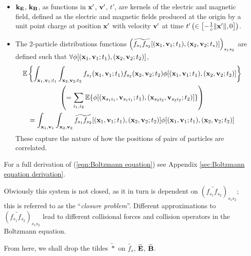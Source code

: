     \begin{itemize}
        \item  $\mathbf{k}_{\mathbf{E}}$, $\mathbf{k}_{\mathbf{B}}$, as functions in $\mathbf{x}'$, $\mathbf{v}'$, $t'$, are kernels of the electric and magnetic field, defined as the electric and magnetic fields produced at the origin by a unit point charge at position $\mathbf{x}'$ with velocity $\mathbf{v}'$ at time $t' \left(\in \left[-\frac{1}{c}\|\mathbf{x}'\|, 0\right]\right)$. 
        
        \item  The 2-particle distributions functions $\left(\widetilde{f_{s_{1}}f_{s_{2}}}[(\mathbf{x}_{1}, \mathbf{v}_{1}; t_{1}), (\mathbf{x}_{2}, \mathbf{v}_{2}; t_{s})]\right)_{s_{1}s_{2}}$ are defined such that $\forall \phi[(\mathbf{x}_{1}, \mathbf{v}_{1}; t_{1}), (\mathbf{x}_{2}, \mathbf{v}_{2}; t_{2})]$,
        \begin{multline}
            \mathbb{E}\left\{\int_{\mathbf{x}_{1}, \mathbf{v}_{1}; t_{1}}\int_{\mathbf{x}_{2}, \mathbf{v}_{2}; t_{2}}f_{s_{1}}(\mathbf{x}_{1}, \mathbf{v}_{1}; t_{1})f_{s_{2}}(\mathbf{x}_{2}, \mathbf{v}_{2}; t_{2})\phi[(\mathbf{x}_{1}, \mathbf{v}_{1}; t_{1}), (\mathbf{x}_{2}, \mathbf{v}_{2}; t_{2})]\right\}  \\
            \left(=  \sum_{i_{1}, i_{2}}\mathbb{E}\{\phi[(\mathbf{x}_{s_{1}i_{1}}, \mathbf{v}_{s_{1}i_{1}}; t_{1}), (\mathbf{x}_{s_{2}i_{2}}, \mathbf{v}_{s_{2}i_{2}}; t_{2})]\}\right)  \\
            =  \int_{\mathbf{x}_{1}, \mathbf{v}_{1}}\int_{\mathbf{x}_{2}, \mathbf{v}_{2}}\widetilde{f_{s_{1}}f_{s_{2}}}[(\mathbf{x}_{1}, \mathbf{v}_{1}; t_{1}), (\mathbf{x}_{2}, \mathbf{v}_{2}; t_{2})]\phi[(\mathbf{x}_{1}, \mathbf{v}_{1}; t_{1}), (\mathbf{x}_{2}, \mathbf{v}_{2}; t_{2})]
        \end{multline}
        These capture the nature of how the positions of pairs of particles are correlated.
    \end{itemize}
    For a full derivation of (\ref{eqn:Boltzmann equation}) see Appendix \ref{sec:Boltzmann equation derivation}.

    Obviously this system is not closed, as it in turn is dependent on $\left(\widetilde{f_{s_{1}}f_{s_{2}}}\right)_{s_{1}s_{2}}$; this is referred to as the ``\emph{closure problem}''. Different approximations to $\left(\widetilde{f_{s_{1}}f_{s_{2}}}\right)_{s_{1}s_{2}}$ lead to different collisional forces and collision operators in the Boltzmann equation.

    From here, we shall drop the tildes $\widetilde{*}$ on $\widetilde{f_{s}}$, $\widetilde{\mathbf{E}}$, $\widetilde{\mathbf{B}}$.
    